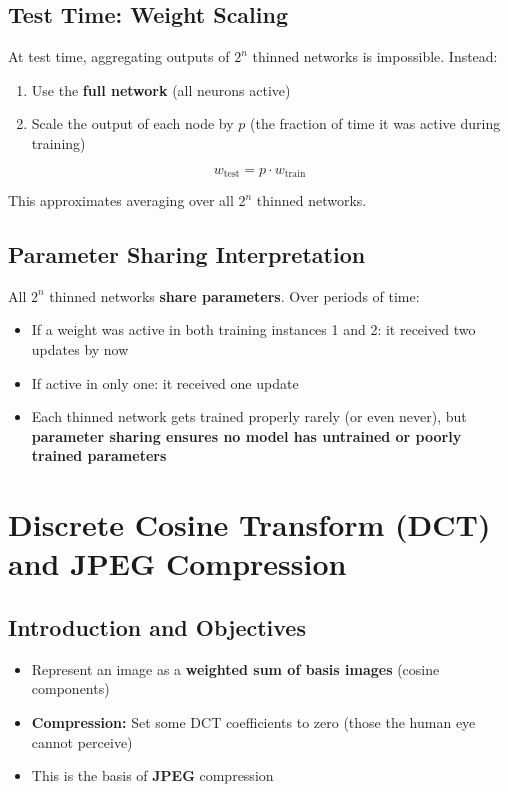 \documentclass[12pt,a4paper]{article}
\begin{document}
\subsection{Test Time: Weight Scaling}

At test time, aggregating outputs of $2^n$ thinned networks is impossible. Instead:
\begin{enumerate}
  \item Use the \textbf{full network} (all neurons active)
  \item Scale the output of each node by $p$ (the fraction of time it was active during training)
\end{enumerate}

\[
w_{\text{test}} = p \cdot w_{\text{train}}
\]

This approximates averaging over all $2^n$ thinned networks.

\subsection{Parameter Sharing Interpretation}

All $2^n$ thinned networks \textbf{share parameters}. Over periods of time:
\begin{itemize}
  \item If a weight was active in both training instances 1 and 2: it received two updates by now
  \item If active in only one: it received one update
  \item Each thinned network gets trained properly rarely (or even never), but \textbf{parameter sharing ensures no model has untrained or poorly trained parameters}
\end{itemize}

\section{Discrete Cosine Transform (DCT) and JPEG Compression}

\subsection{Introduction and Objectives}

\begin{itemize}
  \item Represent an image as a \textbf{weighted sum of basis images} (cosine components)
  \item \textbf{Compression:} Set some DCT coefficients to zero (those the human eye cannot perceive)
  \item This is the basis of \textbf{JPEG} compression
\end{itemize}
\end{document}
